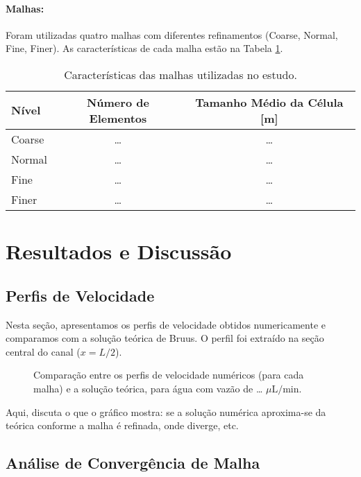 \documentclass[12pt, a4paper]{article}
\begin{document}
\paragraph{Malhas:} Foram utilizadas quatro malhas com diferentes refinamentos (Coarse, Normal, Fine, Finer).  
As características de cada malha estão na Tabela \ref{tab:malhas}.

\begin{table}[H]
    \centering
    \caption{Características das malhas utilizadas no estudo.}
    \label{tab:malhas}
    \begin{tabular}{lcc}
        \toprule
        \textbf{Nível} & \textbf{Número de Elementos} & \textbf{Tamanho Médio da Célula [m]} \\
        \midrule
        Coarse & \dots & \dots \\
        Normal & \dots & \dots \\
        Fine & \dots & \dots \\
        Finer & \dots & \dots \\
        \bottomrule
    \end{tabular}
\end{table}

\section{Resultados e Discussão}

\subsection{Perfis de Velocidade}

Nesta seção, apresentamos os perfis de velocidade obtidos numericamente e comparamos com a solução teórica de Bruus.  
O perfil foi extraído na seção central do canal (\(x = L/2\)).

\begin{figure}[H]
    \centering
    \caption{Comparação entre os perfis de velocidade numéricos (para cada malha) e a solução teórica, para água com vazão de … \(\mu\mathrm{L/min}\).}
    \label{fig:perfil_velocidade}
\end{figure}

Aqui, discuta o que o gráfico mostra: se a solução numérica aproxima-se da teórica conforme a malha é refinada, onde diverge, etc.

\subsection{Análise de Convergência de Malha}
\end{document}
